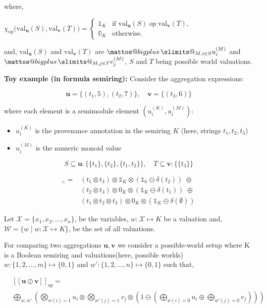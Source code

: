 \documentclass[twocolumn]{article}
\makeatletter
\newcommand{\bigplus}{%
  \DOTSB\mathop{\mathpalette\mattos@bigplus\relax}\slimits@
}
\newcommand\mattos@bigplus[2]{%
  \vcenter{\hbox{%
    \sbox\z@{$#1\sum$}%
    \resizebox{!}{0.9\dimexpr\ht\z@+\dp\z@}{\raisebox{\depth}{$\m@th#1+$}}%
  }}%
  \vphantom{\sum}%
}
\makeatother
\begin{document}
where,

$\chi_{\mathrm{op}}\bigl(\mathrm{val}_\mathbf{u}(S), \mathrm{val}_\mathbf{v}(T)\bigr)=\begin{cases}
\mathbb{1}_K & \text{if } \mathrm{val}_\mathbf{u}(S) \;\mathit{op}\; \mathrm{val}_\mathbf{v}(T),\\
\mathbb{0}_K & \text{otherwise.}
\end{cases}$ 

and, 
$\mathrm{val}_\mathbf{u}(S)$ and $\mathrm{val}_\mathbf{v}(T)$ are $\bigplus_{M, i \in S}u_i^{(M)}$  and 
$\bigplus_{M, j \in T}v_j^{(M)}$, $S$ and $T$ being possible world valuations.

\textbf{Toy example (in formula semiring):}
Consider the aggregation expressions:

\[
\mathbf{u} = \{ (t_1,5), (t_2,7) \}, \quad
\mathbf{v} = \{ (t_3,6) \}
\]

where each element is a semimodule element $(u_i^{(K)}, u_i^{(M)})$:

\begin{itemize}
    \item $u_i^{(K)}$ is the provenance annotation in the semiring $K$ (here, strings $t_1, t_2, t_3$)
    \item $u_i^{(M)}$ is the numeric monoid value
\end{itemize}
\[
S \subseteq \mathbf{u}: \{ \{t_1\}, \{t_2\}, \{t_1,t_2\} \}, \quad
T \subseteq \mathbf{v}: \{ \{t_3\} \}
\]

\begin{align*}
[\mathbf{u} \oslash \mathbf{v}]_{<}
= 
&(t_1 \otimes t_3) \otimes \mathbb{1}_K \otimes (\mathbb{1_k}\ominus\delta(t_2)) 
\;\oplus\;\\ 
&(t_2 \otimes t_3) \otimes 0_K \otimes (\mathbb{1}_K\ominus\delta(t_1)) 
\;\oplus\;\\
&(t_1 \otimes t_2 \otimes t_3) \otimes 0_K \otimes (\mathbb{1}_K\ominus\delta(\emptyset))
\end{align*}


Let $\mathcal{X} = \{x_1, x_2, \dots, x_n\}$, be the variables, $w: \mathcal{X} \mapsto K$ be a valuation and,
$\mathcal{W} = \{w \mid w:\mathcal{X} \mapsto K\}$, be the set of all valuations.

For comparing two aggregations $\mathbf{u},\mathbf{v}$ we consider a possible-world setup where K is a Boolean semiring and valuations(here, possible worlds)
$w: \{1,2,\dots,m\} \mapsto \{0,1\}$ and $w': \{1,2,\dots,n\} \mapsto \{0,1\}$ such that, 

\begin{align*}
  &[[\mathbf{u} \oslash \mathbf{v}]]_{op}=\\
  &\bigoplus_{w,w'}\left(\bigotimes_{w(i)=1}u_i\otimes\bigotimes_{w'(j) = 1}v_j\otimes\left(1\ominus(\bigoplus_{w(i) =0}u_i\oplus \bigoplus_{w'(j) = 0}v_j)\right)\right)
\end{align*}
\end{document}
